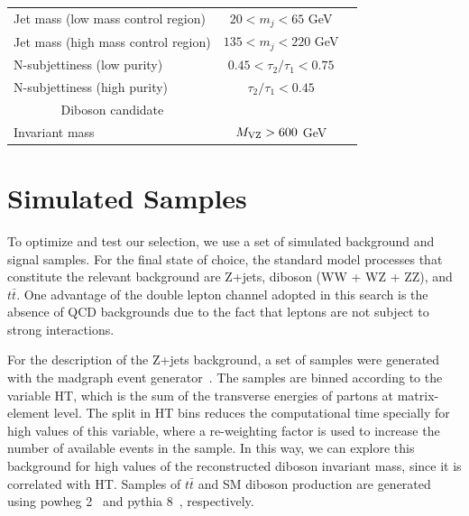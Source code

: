 \begin{landscape}
\begin{table}[p]
\begin{center}
\begin{tabular}{lcc}
Jet mass (low mass control region)       & $ 20 < m_j < 65 $ GeV \T& \\
Jet mass (high mass control region)     & $ 135 < m_j < 220 $ GeV \T& \\
N-subjettiness (low purity)             & $ 0.45 < \tau_2/\tau_1 < 0.75 $  \T& \\
N-subjettiness (high purity)            & $ \tau_2/\tau_1 < 0.45$  \T& \\
\hline
\multicolumn{1}{c}{Diboson candidate \T}\\
\cline{1-1}
Invariant mass & $M_{\rm VZ}>600$ GeV        \T& \\
\hline						       
\end{tabular}
\end{center}
\end{table}
\end{landscape}

\clearpage
\section{Simulated Samples}

To optimize and test our selection, we use a set of simulated background and signal samples. For the final state of choice, the standard model processes that constitute the relevant background are Z+jets, diboson (WW + WZ + ZZ), and $t\bar{t}$. One advantage of the double lepton channel adopted in this search is the absence of QCD backgrounds due to the fact that leptons are not subject to strong interactions. 

For the description of the Z+jets background, a set of samples were generated with the {\sc madgraph} event generator~\cite{Alwall:2014hca}. The samples are binned according to the variable HT, which is the sum of the transverse energies of partons at matrix-element level. The split in HT bins reduces the computational time specially for high values of this variable, where a re-weighting factor is used to increase the number of available events in the sample. In this way, we can explore this background for high values of the reconstructed diboson invariant mass, since it is correlated with HT. Samples of $t\bar{t}$ and SM diboson production are generated using {\sc powheg} 2~\cite{Nason:2004,Frixione:2007,Alioli:2008} and {\sc pythia} 8~\cite{PYTHIA6, PYTHIA8}, respectively.

